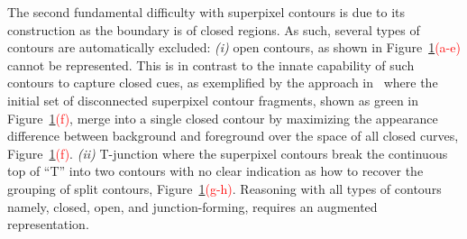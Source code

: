 \begin{figure}[!ht]

 \label{fig:sp_probs2}
\end{figure}

The second fundamental difficulty with superpixel contours is due to its construction as the boundary is of closed regions. As such, several types of contours are automatically excluded: \emph{(i)} open contours, as shown in Figure~\ref{fig:sp_probs2}\textcolor{red}{(a-e)} cannot be represented. This is in contrast to the innate capability of such contours to capture closed cues, as exemplified by the approach in~\cite{Levinshtein:etal:IJCV12} where the initial set of disconnected superpixel contour fragments, shown as green in Figure~\ref{fig:sp_probs2}\textcolor{red}{(f)}, merge into a single closed contour by maximizing the appearance difference between background and foreground over the space of all closed curves, Figure~\ref{fig:sp_probs2}\textcolor{red}{(f)}. \emph{(ii)} T-junction where the superpixel contours break the continuous top of ``T'' into two contours with no clear indication as how to recover the grouping of split contours, Figure~\ref{fig:sp_probs2}\textcolor{red}{(g-h)}.  Reasoning with all types of contours namely, closed, open, and junction-forming, requires an augmented representation.  









